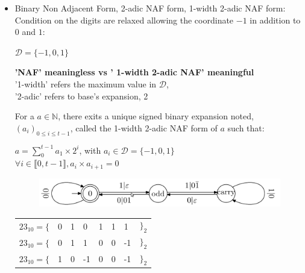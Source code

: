 					

\begin{itemize}	
	\item Binary Non Adjacent Form, 2-adic NAF form, 1-width 2-adic NAF form: \\
		Condition on the digits are relaxed allowing the
		coordinate $-1$ in addition to $0$ and $1$: 
		\begin{center}
			$\mathcal{D} =\{ -1,0,1\}$\\
		\end{center}
		\begin{center}
			\textbf{'NAF' meaningless   vs   ' 1-width 2-adic NAF' meaningful}\\
		'1-width' refers the maximum value in $\mathcal{D} $, \\
		'2-adic' refers to base's expansion, 2	
		\end{center}

	\begin{mythm}[Reitwiesner' 1960] 
		For a $a \in \mathbb{N} $, there exits a unique signed binary expansion noted, 
		$(a_i)_{0 \leq i \leq t-1 }$,
		 called the 1-width 2-adic NAF form of $a$
		such that:
		\begin{center}
		     $a =  \sum \limits_0^{t-1} a_1 \times 2^i$, with $a_i \in \mathcal{D} =\{ -1,0,1\}$ \\
		     $\forall i \in \llbracket 0,t-1 \rrbracket,   a_i \times a_{i+1} =0$
		\end{center}
        \begin{figure}[!h]
            \centering
        	\includegraphics[width=15cm]{images/RtoL_unsignedbinary_to_2naf.png}
   		\end{figure}
	\end{mythm}


			\begin{center}
				\begin{tabular*}{10cm}{p{1.75cm}p{0.35cm}p{0.35cm}p{0.35cm}p{0.35cm}p{0.35cm}p{0.35cm}p{0.75cm}}		
     $ 23_{10} = \{$  &  0  &   1 &  0  &  1  &  1  &  1  &  $\}_2$\\	
     $ 23_{10} = \{$  &  0  &  1  &  1  &  0  &  0  & -1  &  $\}_2$\\
     $ 23_{10} = \{$  &  1  &  0  & -1  &  0  &  0  & -1  &  $\}_2$\\
				\end{tabular*}
			\end{center}


\end{itemize}
